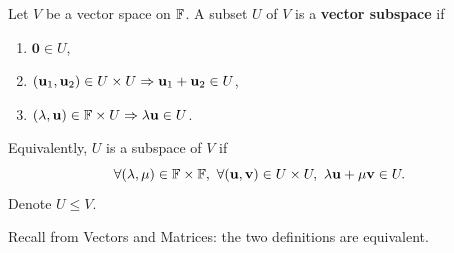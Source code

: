 \documentclass[a4paper]{article}
\begin{document}
\begin{definition}[Subspace]
    Let $V$ be a vector space on ${\mathbb{F}}$. A subset $U$ of $V$ is a \textbf{vector subspace} if 
    \begin{enumerate}
        \item $ \mathbf{0}\in U $,
        \item $ ({\bf u}_1,{\bf u}_2)\in U\times U \Rightarrow \mathbf{u}_1+\mathbf{u}_2\in U $,
        \item $ (\lambda,{\bf u})\in {\mathbb{F}}\times U \Rightarrow \lambda{\bf u}\in U $.
    \end{enumerate}
    Equivalently, $U$ is a subspace of $V$ if 
    \[
        \forall (\lambda,\mu)\in {\mathbb{F}}\times {\mathbb{F}},\ \forall ({\bf u},{\bf v})\in U\times U,\ \lambda{\bf u}+\mu{\bf v}\in U.
    \]
    Denote $ U\le V $.
\end{definition}
Recall from Vectors and Matrices: the two definitions are equivalent.
\end{document}
